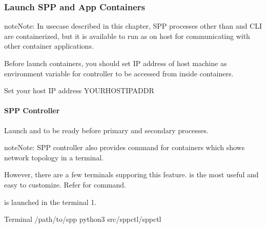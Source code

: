 \documentclass[a4paper,11pt,openany,oneside,english]{sphinxmanual}
\begin{document}
\subsubsection{Launch SPP and App Containers}
\label{\detokenize{tools/sppc/getting_started:launch-spp-and-app-containers}}\label{\detokenize{tools/sppc/getting_started:sppc-gs-launch-containers}}
\begin{sphinxadmonition}{note}{Note:}
In usecase described in this chapter, SPP processes other than
 and CLI are containerized, but it is available to run as on
host for communicating with other container applications.
\end{sphinxadmonition}

Before launch containers, you should set IP address of host machine as
 environment variable for controller to be accessed from
inside containers.

\begin{sphinxVerbatim}[commandchars=\\\{\},formatcom=\footnotesize]
 Set your host IP address
  YOUR\PYGZus{}HOST\PYGZus{}IPADDR
\end{sphinxVerbatim}


\paragraph{SPP Controller}
\label{\detokenize{tools/sppc/getting_started:spp-controller}}
Launch  and  to be ready before primary and secondary
processes.

\begin{sphinxadmonition}{note}{Note:}
SPP controller also provides  command for containers which
shows network topology in a terminal.

However, there are a few terminals supporing this feature.
 is the most useful and easy to customize.
Refer {\hyperref[\detokenize{commands/experimental::doc}]{}} for  command.
\end{sphinxadmonition}

 is launched in the terminal 1.

\begin{sphinxVerbatim}[commandchars=\\\{\},formatcom=\footnotesize]
 Terminal 
  /path/to/spp
 python3 src/spp\PYGZhy{}ctl/spp\PYGZhy{}ctl
\end{sphinxVerbatim}
\end{document}
